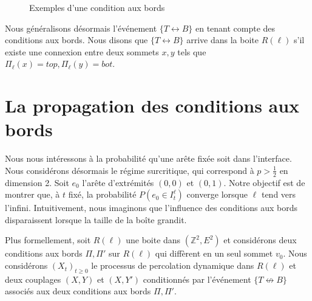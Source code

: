 \documentclass[titlepage,a4paper,12pt]{article}
\newcounter{prop}
\newcounter{cor}
\begin{document}
\begin{figure}[h]
\center
{}
\caption{Exemples d'une condition aux bords}
\end{figure}

Nous généralisons désormais l'événement $\{T\longleftrightarrow B\}$ en tenant compte des conditions aux bords. Nous disons que $\{T\longleftrightarrow B\}$ arrive dans la boite $R(\ell)$ s'il existe une connexion entre deux sommets $x,y$ tels que $\Pi_{\ell}(x) = top, \Pi_{\ell}(y) = bot$.
\section{La propagation des conditions aux bords}
Nous nous intéressons à la probabilité qu'une arête fixée soit dans l'interface. Nous considérons désormais le régime surcritique, qui correspond à $p>\frac{1}{2}$ en dimension 2. Soit $e_0$ l'arête d'extrémités $(0,0)$ et $(0,1)$. Notre objectif est de montrer que, à $t$ fixé, la probabilité $P(e_0 \in I^\ell_t)$ converge lorsque $\ell$ tend vers l'infini. Intuitivement, nous imaginons que l'influence des conditions aux bords disparaissent lorsque la taille de la boîte grandit. %

Plus formellement, soit $R(\ell)$ une boite dans $(\mathbb{Z}^2,E^2)$ et considérons deux conditions aux bords $\Pi, \Pi'$ sur $R(\ell)$ qui diffèrent en un seul sommet $v_0$. Nous considérons $(X_t)_{t\geqslant 0}$ le processus de percolation dynamique dans $R(\ell)$ et deux couplages $(X,Y)$ et $(X,Y')$ conditionnés par l'événement $\{T\nleftrightarrow B\}$ associés aux deux conditions aux bords $\Pi, \Pi'$.
\end{document}
